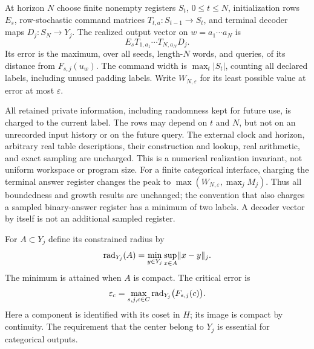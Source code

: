 \begin{definition}\label{def:machine54}
At horizon $N$ choose finite nonempty registers $S_t$, $0\le t\le N$, initialization rows $E_s$, row-stochastic command matrices $T_{t,a}:S_{t-1}\to S_t$, and terminal decoder maps $D_j:S_N\to Y_j$. The realized output vector on $w=a_1\cdots a_N$ is
\[
 E_sT_{1,a_1}\cdots T_{N,a_N}D_j.
\]
Its error is the maximum, over all seeds, length-$N$ words, and queries, of its distance from $F_{s,j}(u_w)$. The command width is $\max_t|S_t|$, counting all declared labels, including unused padding labels. Write $W_{N,\varepsilon}$ for its least possible value at error at most $\varepsilon$.
\end{definition}
All retained private information, including randomness kept for future use, is charged to the current label. The rows may depend on $t$ and $N$, but not on an unrecorded input history or on the future query. The external clock and horizon, arbitrary real table descriptions, their construction and lookup, real arithmetic, and exact sampling are uncharged. This is a numerical realization invariant, not uniform workspace or program size. For a finite categorical interface, charging the terminal answer register changes the peak to $\max(W_{N,\varepsilon},\max_j M_j)$. Thus all boundedness and growth results are unchanged; the convention that also charges a sampled binary-answer register has a minimum of two labels. A decoder vector by itself is not an additional sampled register.

For $A\subset Y_j$ define its constrained radius by
\[
 \operatorname{rad}_{Y_j}(A)=\min_{y\in Y_j}\sup_{x\in A}\lVert x-y\rVert_j.
\]
The minimum is attained when $A$ is compact. The critical error is
\begin{equation}\label{eq:radius54}
 \varepsilon_{\mathrm c}=\max_{s,j,c\in C}\operatorname{rad}_{Y_j}\bigl(F_{s,j}(c)\bigr).
\end{equation}
Here a component is identified with its coset in $H$; its image is compact by continuity. The requirement that the center belong to $Y_j$ is essential for categorical outputs.


